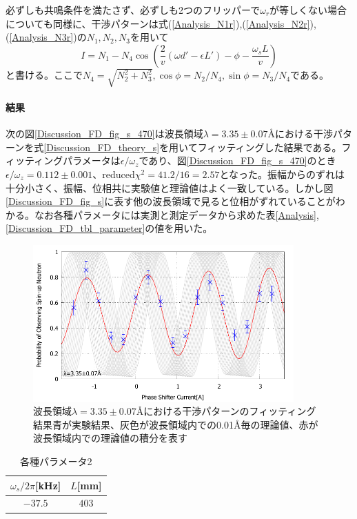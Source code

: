 必ずしも共鳴条件を満たさず、必ずしも2つのフリッパーで$\omega_r$が等しくない場合についても同様に、干渉パターンは式(\ref{Analysis_N1r}),(\ref{Analysis_N2r}),(\ref{Analysis_N3r})の$N_1,N_2,N_3$を用いて
\begin{equation}
I=N_1-N_4\cos\left(\frac{2}{v} (\omega d' -\epsilon L') -\phi -\frac{\omega_s L}{v} \right)\label{Disucussion_FD_theory_s}
\end{equation}
と書ける。ここで$N_4=\sqrt{N_2^2+N_3^2},\cos\phi=N_2/N_4,\sin\phi=N_3/N_4$である。

\paragraph{結果}
次の図\ref{Discussion_FD_fig_s_470}は波長領域$\lambda=3.35\pm0.07$\AA における干渉パターンを式\ref{Discussion_FD_theory_s}を用いてフィッティングした結果である。フィッティングパラメータは$\epsilon/\omega_z$であり、図\ref{Discussion_FD_fig_s_470}のとき$\epsilon/\omega_z=0.112\pm0.001$、reduced$\chi^2=41.2/16=2.57$となった。振幅からのずれは十分小さく、振幅、位相共に実験値と理論値はよく一致している。しかし図\ref{Discussion_FD_fig_s}に表す他の波長領域で見ると位相がずれていることがわかる。なお各種パラメータには実測と測定データから求めた表\ref{Analysis},\ref{Discussion_FD_tbl_parameter}の値を用いた。
\begin{figure}[h]
\centering
\includegraphics[width=10cm]{discussion/FD/IT_s_470.pdf}
\caption{波長領域$\lambda=3.35\pm0.07$\AA における干渉パターンのフィッティング結果\newline 青が実験結果、灰色が波長領域内での0.01\AA 毎の理論値、赤が波長領域内での理論値の積分を表す}
\end{figure}

\begin{table}[h]
\centering
\caption{各種パラメータ2}
\begin{tabular}{cc}
$\omega_s/2\pi$[kHz]&$L$[mm]\\ \hline
$-37.5$&$403$
\end{tabular}
\end{table}

